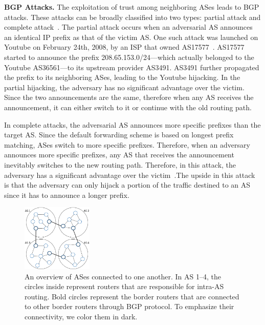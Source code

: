 \documentclass[conference]{IEEEtran}
\newcommand{\BfPara}[1]{{\noindent\bf#1.}\xspace}
\begin{document}
\BfPara{BGP Attacks}\label{bgp:attacks}
The exploitation of trust among neighboring ASes leads to BGP attacks. These attacks can be broadly classified into two types: partial attack and complete attack~\cite{BGPHijack}. The partial attack occurs when an adversarial AS announces an identical IP prefix as that of the victim AS. One such attack was launched on Youtube on February 24th, 2008, by an ISP that owned AS17577~\cite{BiersackJFFTTTV12,WongS11}. AS17577 started to announce the prefix 208.65.153.0/24---which actually belonged to the Youtube AS36561---to its upstream provider AS3491. AS3491 further propagated the prefix to its neighboring ASes, leading to the Youtube hijacking. In the partial hijacking, the adversary has no significant advantage over the victim. Since the two announcements are the same, therefore when any AS receives the announcement, it can either switch to it or continue with the old routing path. 

In complete attacks, the adversarial AS announces more specific prefixes than the target AS. Since the default forwarding scheme is based on longest prefix matching, ASes switch to more specific prefixes. Therefore, when an adversary announces more specific prefixes, any AS that receives the announcement inevitably switches to the new routing path. Therefore, in this attack, the adversary has a significant advantage over the victim~\cite{BGPHijack}.The upside in this attack is that the adversary can only hijack a portion of the traffic destined to an AS since it has to announce a longer prefix.

\begin{figure}[t]
\begin{center}
\includegraphics[width=0.30\textwidth]{fig/ASes.pdf}
\caption{An overview of ASes connected to one another. In AS 1--4, the circles inside represent routers that are responsible for intra-AS routing. Bold circles represent the border routers that are connected to other border routers through BGP protocol. To emphasize their connectivity, we color them in dark.  } 
\label{fig:ASes}
\end{center}

\end{figure}
\end{document}
